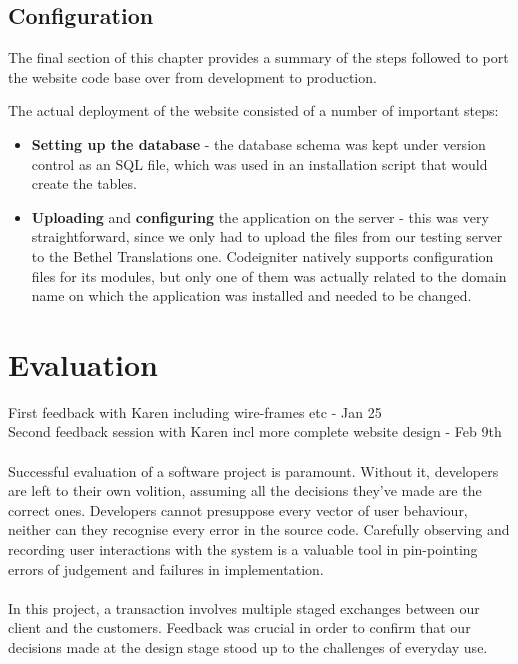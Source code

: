 \documentclass{l3proj}
\begin{document}
\section{Configuration}
The final section of this chapter provides a summary of the steps followed to port the website code base over
from development to production.

The actual deployment of the website consisted of a number of important steps:
\begin{itemize}
	\item \textbf{Setting up the database} - the database schema was kept under
		version
		control as an SQL file, which was used in an installation script that
		would create the tables.
	\item \textbf{Uploading} and \textbf{configuring} the application on the
		server - this was
		very straightforward, since we only had to upload the files from our
		testing server to the Bethel Translations one. Codeigniter natively 
		supports configuration files for its modules, but only one of them
		was actually related to the domain name on which the application was
		installed and needed to be changed.
\end{itemize}

\chapter{Evaluation}
\label{chap:eval}
First feedback with Karen including wire-frames etc - Jan 25\\
Second feedback session with Karen incl more complete website design - Feb 9th\\
\\
Successful evaluation of a software project is paramount. Without it,
developers are left to their own volition, assuming all the decisions they've
made are the correct ones. Developers cannot presuppose every vector of user
behaviour, neither can they recognise every error in the source code. Carefully
observing and recording user interactions with the system is a valuable tool
in pin-pointing errors of judgement and failures in implementation.\\
\\
In this project, a transaction involves multiple staged exchanges
between our client and the customers. Feedback was crucial in order to confirm
that our decisions made at the design stage stood up to the challenges of
everyday use.
\end{document}

